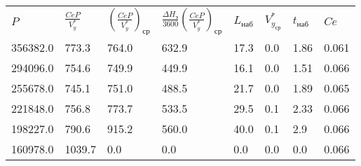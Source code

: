 \begin{tabular}{llllllll}
$P$ & $\frac{CeP}{V_y^*}$ & $(\frac{CeP}{V_y^*})_{ср}$ & $\frac{\Delta H_э}{3600}(\frac{CeP}{V_y^*})_{ср}$ & $L_{наб}$ & $V_{y_{ср}}^*$ & $t_{наб}$ & $Ce$ \\
356382.0 & 773.3 & 764.0 & 632.9 & 17.3 & 0.0 & 1.86 & 0.061 \\
294096.0 & 754.6 & 749.9 & 449.9 & 16.1 & 0.0 & 1.51 & 0.066 \\
255678.0 & 745.1 & 751.0 & 488.5 & 21.7 & 0.0 & 1.89 & 0.065 \\
221848.0 & 756.8 & 773.7 & 533.5 & 29.5 & 0.1 & 2.33 & 0.066 \\
198227.0 & 790.6 & 915.2 & 560.0 & 40.0 & 0.1 & 2.9 & 0.066 \\
160978.0 & 1039.7 & 0.0 & 0.0 & 0.0 & 0.0 & 0.0 & 0.066 \\
\end{tabular}
